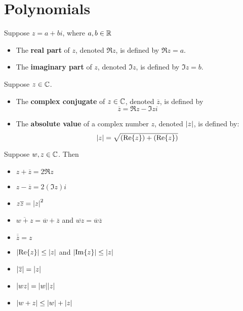 
\section{Polynomials}

\begin{definition}[$\Re{z}, \Im{z}$]
	Suppose $z = a + bi$, where $a, b \in \operatorname{\mathbb{R}}$
	\begin{itemize} 
		\item The \textbf{real part} of $z$, denoted $\Re{z}$, is defined by $\Re{z} = a$.
		\item The \textbf{imaginary part} of $z$, denoted $\Im{z}$, is defined by $\Im{z} = b$.
	\end{itemize}
\end{definition}

\begin{definition}
    Suppose $z \in \operatorname{\mathbb{C}}$.
    \begin{itemize}
        \item The \textbf{complex conjugate} of $z \in \operatorname{\mathbb{C}}$, denoted $\overline{z}$, is defined by
        \[ \overline{z} = \Re{z} - \Im{z}i \]
        \item The \textbf{absolute value} of a complex number $z$, denoted $\abs{z}$, is
        defined by:
        \[ \abs{z} = \sqrt{\qty(\Re{z}) + \qty(\Re{z})} \]
    \end{itemize}
\end{definition}

\begin{theorem}
    Suppose $w, z \in \operatorname{\mathbb{C}}$. Then
    \begin{itemize}
        \item $z + \overline{z} = 2 \Re{z}$
        \item $z - \overline{z} = 2 (\Im z)i$
        \item $z \overline{z} = \abs{z}^2$
        \item $\overline{w + z} = \overline{w} + \overline{z}$ and $\overline{wz} = \overline{w} \overline{z}$
        \item $\overline{\overline{z}} = z$
        \item $\abs{\Re{z}} \leq \abs{z}$ and $\abs{\Im{z}} \leq \abs{z}$
        \item $\abs{\overline{z}} = \abs{z}$
        \item $\abs{wz} = \abs{w} \abs{z}$
        \item $\abs{w+z} \leq \abs{w} + \abs{z}$
    \end{itemize}
\end{theorem}

